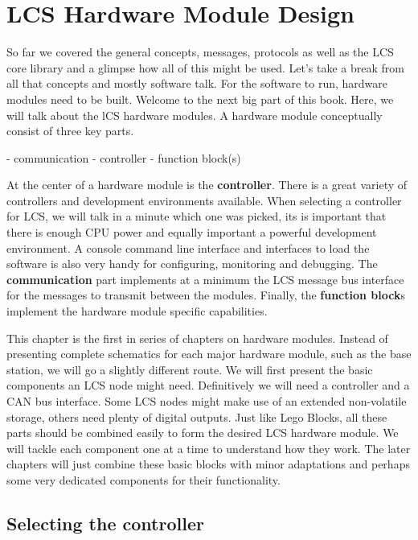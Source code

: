 \chapter{LCS Hardware Module Design}

So far we covered the general concepts, messages, protocols as well as the LCS core library and a glimpse how all of this might be used. Let's take a break from all that concepts and mostly software talk. For the software to run, hardware modules need to be built. Welcome to the next big part of this book. Here, we will talk about the lCS hardware modules. A hardware module conceptually consist of three key parts.

- communication
- controller
- function block(s)

At the center of a hardware module is the \textbf{controller}. There is a great variety of controllers and development environments available. When selecting a controller for LCS, we will talk in a minute which one was picked, its is important that there is enough CPU power and equally important a powerful development environment. A console command line interface and interfaces to load the software is also very handy for configuring, monitoring and debugging. The \textbf{communication} part implements at a minimum the LCS message bus interface for the messages to transmit between the modules. Finally, the \textbf{function block}s implement the hardware module specific capabilities.

 This chapter is the first in series of chapters on hardware modules. Instead of presenting complete schematics for each major hardware module, such as the base station, we will go a slightly different route. We will first present the basic components an LCS node might need. Definitively we will need a controller and a CAN bus interface. Some LCS nodes might make use of an extended non-volatile storage, others need plenty of digital outputs. Just like Lego Blocks, all these parts should be combined easily to form the desired LCS hardware module. We will tackle each component one at a time to understand how they work. The later chapters will just combine these basic blocks with minor adaptations and perhaps some very dedicated components for their functionality.

\section{Selecting the controller}

